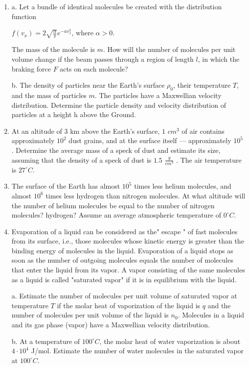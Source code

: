 \documentclass{article}
\begin{document}
\begin{enumerate}[label=5.2.\arabic*]
\item a. Let a bundle of identical molecules be created with the distribution function
 
$f(v_x) = 2 \sqrt{\frac{\alpha}{\pi}}e^{ - a v^2_x}$, where $\alpha > 0$.

The mass of the molecule is $m$. How will the number of molecules per unit volume change if the beam passes through a region of length $l$, in which the braking force $F$ acts on each molecule?

b. The density of particles near the Earth's surface $\rho_0$, their temperature $T$, and the mass of particles $m$. The particles have a Maxwellian velocity distribution. Determine the particle density and velocity distribution of particles at a height h above the Ground.

\item At an altitude of $3$ km above the Earth's surface, $1$ $cm^3$ of air contains approximately $10^2$ dust grains, and at the surface itself — approximately $10^5$ . Determine the average mass of a speck of dust and estimate its size, assuming that the density of a speck of dust is $1.5$ $\frac{g}{cm^3}$ . The air temperature is $27^{\circ} C$.

\item The surface of the Earth has almost $10^5$ times less helium molecules, and almost $10^6$ times less hydrogen than nitrogen molecules. At what altitude will the number of helium molecules be equal to the number of nitrogen molecules? hydrogen? Assume an average atmospheric temperature of $0^\circ C$.

\item Evaporation of a liquid can be considered as the" escape " of fast molecules from its surface, i.e., those molecules whose kinetic energy is greater than the binding energy of molecules in the liquid. Evaporation of a liquid stops as soon as the number of outgoing molecules equals the number of molecules that enter the liquid from its vapor. A vapor consisting of the same molecules as a liquid is called "saturated vapor" if it is in equilibrium with the liquid. 

a. Estimate the number of molecules per unit volume of saturated vapor at temperature $T$ if the molar heat of vaporization of the liquid is $q$ and the number of molecules per unit volume of the liquid is $n_0$. Molecules in a liquid and its gas phase (vapor) have a Maxwellian velocity distribution. 

b. At a temperature of $100^\circ C$, the molar heat of water vaporization is about $4 \cdot 10^4$ J/mol. Estimate the number of water molecules in the saturated vapor at $100^{\circ} C$.




\end{enumerate}
\end{document}
